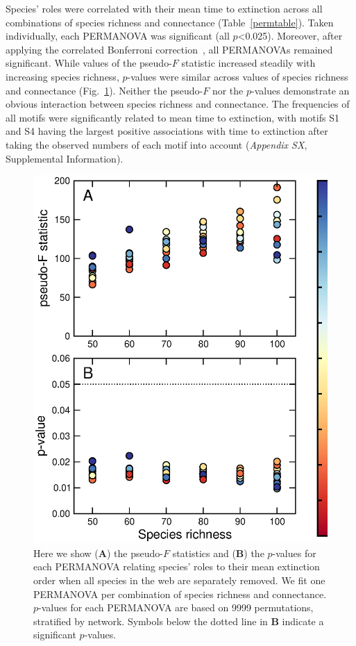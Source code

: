 \documentclass[12pt]{article}
\begin{document}
		Species' roles were correlated with their mean time to extinction across all combinations of species richness and connectance (Table~\ref{permtable}). Taken individually, each PERMANOVA was significant (all $p$\textless0.025). Moreover, after applying the correlated Bonferroni correction~\citep{Drezner2016}, all PERMANOVAs remained significant. While values of the pseudo-$F$ statistic increased steadily with increasing species richness, $p$-values were similar across values of species richness and connectance (Fig.~\ref{permfig}). Neither the pseudo-$F$ nor the $p$-values demonstrate an obvious interaction between species richness and connectance.
        The frequencies of all motifs were significantly related to mean time to extinction, with motifs S1 and S4 having the largest positive associations with time to extinction after taking the observed numbers of each motif into account (\emph{Appendix SX}, Supplemental Information).


			\begin{figure}[hb!]
				\caption{Here we show (\textbf{A}) the pseudo-$F$ statistics and (\textbf{B}) the $p$-values for each PERMANOVA relating species' roles to their mean extinction order when all species in the web are separately removed. We fit one PERMANOVA per combination of species richness and connectance. $p$-values for each PERMANOVA are based on 9999 permutations, stratified by network. Symbols below the dotted line in \textbf{B} indicate a significant $p$-values.}
				\label{permfig}
				\includegraphics[height=.5\textheight]{figures/extinction_order/permanova_summary_paper_full.eps}
				\end{figure}
\end{document}
